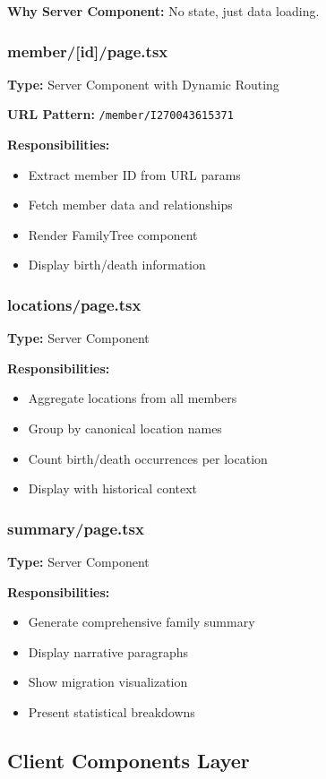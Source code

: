 \documentclass[11pt]{article}
\begin{document}
\textbf{Why Server Component:} No state, just data loading.

\subsubsection{member/[id]/page.tsx}
\textbf{Type:} Server Component with Dynamic Routing

\textbf{URL Pattern:} \texttt{/member/I270043615371}

\textbf{Responsibilities:}
\begin{itemize}
    \item Extract member ID from URL params
    \item Fetch member data and relationships
    \item Render FamilyTree component
    \item Display birth/death information
\end{itemize}

\subsubsection{locations/page.tsx}
\textbf{Type:} Server Component

\textbf{Responsibilities:}
\begin{itemize}
    \item Aggregate locations from all members
    \item Group by canonical location names
    \item Count birth/death occurrences per location
    \item Display with historical context
\end{itemize}

\subsubsection{summary/page.tsx}
\textbf{Type:} Server Component

\textbf{Responsibilities:}
\begin{itemize}
    \item Generate comprehensive family summary
    \item Display narrative paragraphs
    \item Show migration visualization
    \item Present statistical breakdowns
\end{itemize}

\subsection{Client Components Layer}
\end{document}
